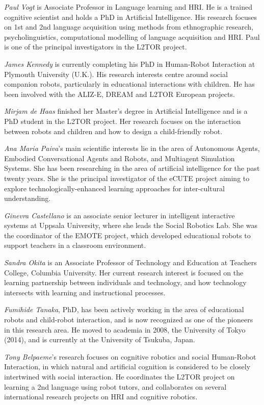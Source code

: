 \documentclass{sig-alternate-05-2015}
\begin{document}
\emph{Paul Vogt} is Associate Professor in Language learning and HRI. He is a trained cognitive scientist and holds a PhD in Artificial Intelligence. His research focuses on 1st and 2nd language acquisition using methods from ethnographic research, psycholinguistics, computational modelling of language acquisition and HRI. Paul is one of the principal investigators in the L2TOR project.

\emph{James Kennedy} is currently completing his PhD in Human-Robot Interaction at Plymouth University (U.K.). His research interests centre around social companion robots, particularly in educational interactions with children. He has been involved with the ALIZ-E, DREAM and L2TOR European projects.

\emph{Mirjam de Haas} finished her Master's degree in Artificial Intelligence and is a PhD student in the L2TOR project. Her research focuses on the interaction between robots and children and how to design a child-friendly robot.

\emph{Ana Maria Paiva}'s main scientific interests lie in the area of Autonomous Agents, Embodied Conversational Agents and Robots, and Multiagent Simulation Systems. She has been researching in the area of artificial intelligence for the past twenty years. She is the principal investigator of the eCUTE project aiming to explore technologically-enhanced learning approaches for inter-cultural understanding.

\emph{Ginevra Castellano} is an associate senior lecturer in intelligent interactive systems at Uppsala University, where she leads the Social Robotics Lab. She was the coordinator of the EMOTE project, which developed educational robots to support teachers in a classroom environment.

\emph{Sandra Okita} is an Associate Professor of Technology and Education at Teachers College, Columbia University. Her current research interest is focused on the learning partnership between individuals and technology, and how technology intersects with learning and instructional processes.

\emph{Fumihide Tanaka}, PhD, has been actively working in the area of educational robots and child-robot interaction, and is now recognized as one of the pioneers in this research area. He moved to academia in 2008, the University of Tokyo (2014), and is currently at the University of Tsukuba, Japan.

\emph{Tony Belpaeme}'s research focuses on cognitive robotics and social Human-Robot Interaction, in which natural and artificial cognition is considered to be closely intertwined with social interaction. He coordinates the L2TOR project on learning a 2nd language using robot tutors, and collaborates on several international research projects on HRI and cognitive robotics.
\end{document}
